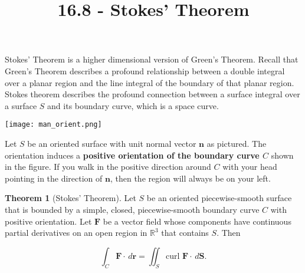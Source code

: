 \documentclass[11pt,oneside,english]{amsart}
\theoremstyle{definition}
\newtheorem{theorem}{Theorem}
\newcommand{\R}{\mathbb{R}}
\begin{document}
\vspace*{-1cm}
\title{16.8 - Stokes' Theorem}
\maketitle



Stokes' Theorem is a higher dimensional version of Green's Theorem. Recall that Green's Theorem describes a profound relationship between a double integral over a planar region and the line integral of the boundary of that planar region. Stokes theorem describes the profound connection between a surface integral over a surface $S$ and its boundary curve, which is a space curve.

\begin{center}
\texttt{[image: man\_orient.png]}
\end{center}

Let $S$ be an oriented surface with unit normal vector $\mathbf{n}$ as pictured. The orientation induces a \textbf{positive orientation of the boundary curve $C$} shown in the figure. If you walk in the positive direction around $C$ with your head pointing in the direction of $\mathbf{n}$, then the region will always be on your left.



\begin{theorem}[Stokes' Theorem]
Let $S$ be an oriented piecewise-smooth surface that is bounded by a simple, closed, piecewise-smooth boundary curve $C$ with positive orientation. Let $\mathbf{F}$ be a vector field whose components have continuous partial derivatives on an open region in $\R^3$ that contains $S$. Then

\[
\int_C\mathbf{F}\cdot\,d\mathbf{r}=\iint_S\text{curl }\mathbf{F}\cdot\,d\mathbf{S}.
\]
\end{theorem}
\end{document}
